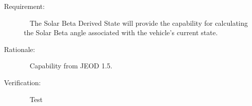 
%
%
% 
%

\label{reqt:SolarBeta}
\begin{description}
  \item[Requirement:]\ \newline
     The Solar Beta Derived State will provide the capability for calculating the Solar Beta angle associated with the vehicle's current state.
  \item[Rationale:]\ \newline
     Capability from JEOD 1.5.
  \item[Verification:]\ \newline
     Test
\end{description}


